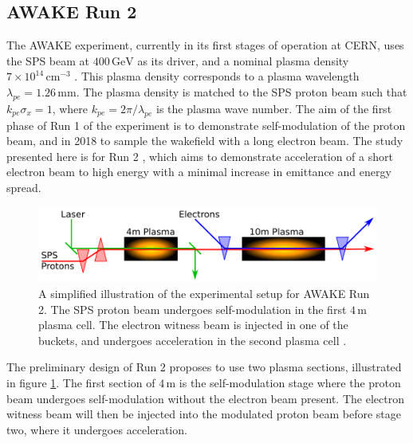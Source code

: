 \documentclass[aps,prstab,reprint,amsmath,amssymb,groupedaddress]{revtex4-1}
\newcommand{\unit}[1]{\,\mathrm{#1}}
\newcommand{\nexp}[1]{\times 10^{#1}}
\begin{document}
\subsection[\label{S:I:AWAKE}]{AWAKE Run 2}

The AWAKE experiment, currently in its first stages of operation at CERN, uses the SPS beam at $400\unit{GeV}$ as its
driver, and a nominal plasma density $7\nexp{14}\unit{cm}^{-3}$ \cite{gschwendtner:2016}. This plasma density
corresponds to a plasma wavelength $\lambda_{pe} = 1.26\unit{mm}$. The plasma density is matched to the SPS proton beam
such that $k_{pe}\sigma_{x} = 1$, where $k_{pe} = 2\pi/\lambda_{pe}$ is the plasma wave number. The aim of the first
phase of Run 1 of the experiment is to demonstrate self-modulation of the proton beam, and in 2018 to sample the
wakefield with a long electron beam. The study presented here is for Run 2 \cite{adli:2016}, which aims to demonstrate
acceleration of a short electron beam to high energy with a minimal increase in emittance and energy spread.

\begin{figure}[hbt]
    \includegraphics[width=0.99\linewidth,trim={1mm 2mm 1mm 2mm},clip]{figures/figAWAKE}
    \caption{\label{Fig:AWAKER2} A simplified illustration of the experimental setup for AWAKE Run 2. The SPS proton
        beam undergoes self-modulation in the first $4\unit{m}$ plasma cell. The electron witness beam is injected in
        one of the buckets, and undergoes acceleration in the second plasma cell \cite{berglyd_olsen:2015, adli:2016}.}
\end{figure}

The preliminary design of Run 2 proposes to use two plasma sections, illustrated in figure \ref{Fig:AWAKER2}.
The first section of $4\unit{m}$ is the self-modulation stage where the proton beam undergoes self-modulation without
the electron beam present. The electron witness beam will then be injected into the modulated proton beam before stage
two, where it undergoes acceleration.
\end{document}

